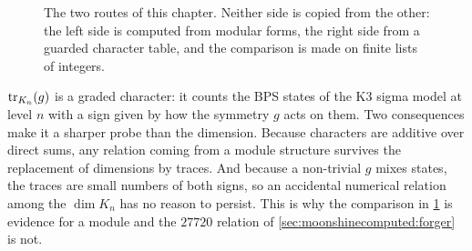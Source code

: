 \begin{figure}[htbp]
\centering
{}
\caption{The two routes of this chapter. Neither side is copied from the other: the left
side is computed from modular forms, the right side from a guarded character table, and the
comparison is made on finite lists of integers.}
\label{fig:moonshinecomputed:tworoutes}
\end{figure}

\begin{physicsbox}
$\operatorname{tr}_{K_n}(g)$ is a graded character: it counts the BPS states of the K3 sigma model at
level $n$ with a sign given by how the symmetry $g$ acts on them. Two consequences make it
a sharper probe than the dimension. Because characters are additive over direct sums, any
relation coming from a module structure survives the replacement of dimensions by traces.
And because a non-trivial $g$ mixes states, the traces are small numbers of both signs, so
an accidental numerical relation among the $\dim K_n$ has no reason to persist. This is why
the comparison in \cref{fig:moonshinecomputed:tworoutes} is evidence for a module and the
$27720$ relation of \cref{sec:moonshinecomputed:forger} is not.
\end{physicsbox}


